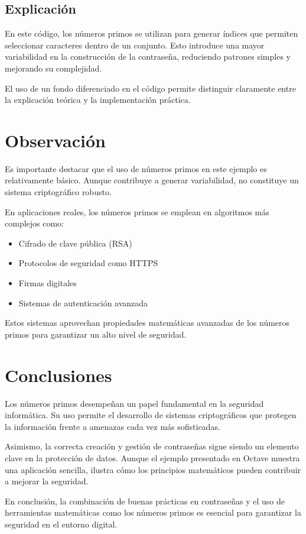 \documentclass[12pt]{article}
\begin{document}
\subsection{Explicación}

En este código, los números primos se utilizan para generar índices que permiten seleccionar caracteres dentro de un conjunto. Esto introduce una mayor variabilidad en la construcción de la contraseña, reduciendo patrones simples y mejorando su complejidad.

El uso de un fondo diferenciado en el código permite distinguir claramente entre la explicación teórica y la implementación práctica.

\section{Observación}

Es importante destacar que el uso de números primos en este ejemplo es relativamente básico. Aunque contribuye a generar variabilidad, no constituye un sistema criptográfico robusto.

En aplicaciones reales, los números primos se emplean en algoritmos más complejos como:

\begin{itemize}
\item Cifrado de clave pública (RSA)
\item Protocolos de seguridad como HTTPS
\item Firmas digitales
\item Sistemas de autenticación avanzada
\end{itemize}

Estos sistemas aprovechan propiedades matemáticas avanzadas de los números primos para garantizar un alto nivel de seguridad.

\section{Conclusiones}

Los números primos desempeñan un papel fundamental en la seguridad informática. Su uso permite el desarrollo de sistemas criptográficos que protegen la información frente a amenazas cada vez más sofisticadas.

Asimismo, la correcta creación y gestión de contraseñas sigue siendo un elemento clave en la protección de datos. Aunque el ejemplo presentado en Octave muestra una aplicación sencilla, ilustra cómo los principios matemáticos pueden contribuir a mejorar la seguridad.

En conclusión, la combinación de buenas prácticas en contraseñas y el uso de herramientas matemáticas como los números primos es esencial para garantizar la seguridad en el entorno digital.
\end{document}
